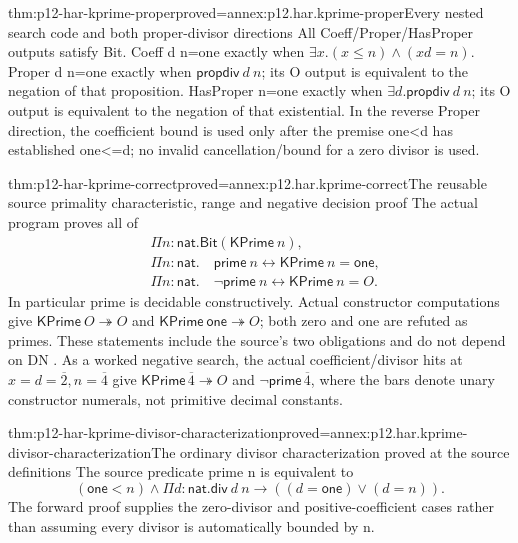 \begin{hblemma}{thm:p12-har-kprime-proper}{proved=annex:p12.har.kprime-proper}{Every nested search code and both proper-divisor directions}
All Coeff/Proper/HasProper outputs satisfy Bit. Coeff d n=one exactly
when \(\exists x.(x\le n)\wedge(xd=n)\). Proper d n=one exactly
when \(\mathsf{propdiv}\ d\ n\); its O output is equivalent to
the negation of that proposition. HasProper n=one exactly when
\(\exists d.\mathsf{propdiv}\ d\ n\); its O output is equivalent
to the negation of that existential. In the reverse Proper direction,
the coefficient bound is used only after the premise one<d has established
one<=d; no invalid cancellation/bound for a zero divisor is used.
\end{hblemma}

\begin{hbtheorem}{thm:p12-har-kprime-correct}{proved=annex:p12.har.kprime-correct}{The reusable source primality characteristic, range and negative decision proof}
The actual program proves all of
\[
\begin{aligned}
 &\Pi n:\mathsf{nat}.\mathsf{Bit}(\mathsf{KPrime}\ n),\\
 &\Pi n:\mathsf{nat}.\quad
       \mathsf{prime}\ n\leftrightarrow\mathsf{KPrime}\ n=\mathsf{one},\\
 &\Pi n:\mathsf{nat}.\quad
       \neg\mathsf{prime}\ n\leftrightarrow\mathsf{KPrime}\ n=O.
\end{aligned}
\]
In particular prime is decidable constructively. Actual constructor
computations give \(\mathsf{KPrime}\ O\twoheadrightarrow O\) and
\(\mathsf{KPrime}\ \mathsf{one}\twoheadrightarrow O\);
both zero and one are refuted as primes. These statements include the
source's two obligations and do not depend on DN
\cite[p.~1221]{BarendregtGeuvers2001}.
As a worked negative search, the actual coefficient/divisor hits at
\(x=d=\overline2,n=\overline4\) give
\(\mathsf{KPrime}\,\overline4\twoheadrightarrow O\) and
\(\neg\mathsf{prime}\,\overline4\), where the bars denote unary
constructor numerals, not primitive decimal constants.
\end{hbtheorem}

\begin{hblemma}{thm:p12-har-kprime-divisor-characterization}{proved=annex:p12.har.kprime-divisor-characterization}{The ordinary divisor characterization proved at the source definitions}
The source predicate prime n is equivalent to
\[
 (\mathsf{one}<n)\wedge
       \Pi d:\mathsf{nat}.\mathsf{div}\ d\ n\to
                       ((d=\mathsf{one})\vee(d=n)).
\]
The forward proof supplies the zero-divisor and positive-coefficient
cases rather than assuming every divisor is automatically bounded by n.
\end{hblemma}

